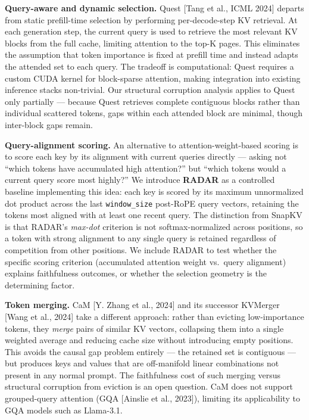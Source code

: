 \documentclass[10pt,letterpaper]{article}
\begin{document}
\textbf{Query-aware and dynamic selection.} Quest {[}Tang et al., ICML
2024{]} departs from static prefill-time selection by performing
per-decode-step KV retrieval. At each generation step, the current query
is used to retrieve the most relevant KV blocks from the full cache,
limiting attention to the top-K pages. This eliminates the assumption
that token importance is fixed at prefill time and instead adapts the
attended set to each query. The tradeoff is computational: Quest
requires a custom CUDA kernel for block-sparse attention, making
integration into existing inference stacks non-trivial. Our structural
corruption analysis applies to Quest only partially --- because Quest
retrieves complete contiguous blocks rather than individual scattered
tokens, gaps within each attended block are minimal, though inter-block
gaps remain.

\textbf{Query-alignment scoring.} An alternative to attention-weight-based
scoring is to score each key by its alignment with current queries directly ---
asking not ``which tokens have accumulated high attention?'' but ``which tokens
would a current query score most highly?'' We introduce \textbf{RADAR} as a
controlled baseline implementing this idea: each key is scored by its maximum
unnormalized dot product across the last \texttt{window\_size} post-RoPE query
vectors, retaining the tokens most aligned with at least one recent query. The
distinction from SnapKV is that RADAR's \emph{max-dot} criterion is not
softmax-normalized across positions, so a token with strong alignment to any
single query is retained regardless of competition from other positions. We
include RADAR to test whether the specific scoring criterion (accumulated
attention weight vs.\ query alignment) explains faithfulness outcomes, or
whether the selection geometry is the determining factor.

\textbf{Token merging.} CaM {[}Y. Zhang et al., 2024{]} and its
successor KVMerger {[}Wang et al., 2024{]} take a different approach:
rather than evicting low-importance tokens, they \emph{merge} pairs of
similar KV vectors, collapsing them into a single weighted average and
reducing cache size without introducing empty positions. This avoids the
causal gap problem entirely --- the retained set is contiguous --- but
produces keys and values that are off-manifold linear combinations not
present in any normal prompt. The faithfulness cost of such merging
versus structural corruption from eviction is an open question. CaM does
not support grouped-query attention (GQA {[}Ainslie et al., 2023{]}), limiting its applicability to
GQA models such as Llama-3.1.
\end{document}
